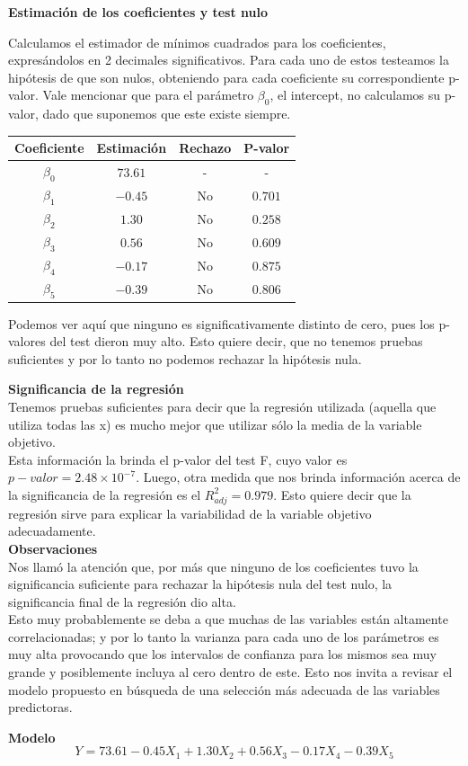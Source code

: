 \textbf{Estimación de los coeficientes y test nulo}

Calculamos el estimador de mínimos cuadrados para los coeficientes, expresándolos en 2 decimales significativos. Para cada uno de estos testeamos la hipótesis de que son nulos, obteniendo para cada coeficiente su correspondiente p-valor. Vale mencionar que para el parámetro $\beta_0$, el intercept, no calculamos su p-valor, dado que suponemos que este existe siempre.

\begin{center}
    \begin{tabular}{|c|c|c|c|}
        \hline
        Coeficiente & Estimación & Rechazo & P-valor \\ \hline
        $\beta_0$ & $73.61$ & - & - \\ \hline
        $\beta_1$ & $-0.45$ & No & $0.701$ \\ \hline
        $\beta_2$ & $1.30$ &  No & $ 0.258$ \\ \hline
        $\beta_3$ & $0.56$ & No & $0.609$ \\ \hline
        $\beta_4$ & $-0.17$ & No & $0.875$ \\ \hline
        $\beta_5$ & $-0.39$ & No & $0.806$ \\ \hline
    \end{tabular}
\end{center}

Podemos ver aquí que ninguno es significativamente distinto de cero, pues los p-valores del test dieron muy alto. Esto quiere decir, que no tenemos pruebas suficientes y por lo tanto no podemos rechazar la hipótesis nula.

\vskip0.2cm\textbf{Significancia de la regresión}\\
Tenemos pruebas suficientes para decir que la regresión utilizada (aquella que utiliza todas las x) es mucho mejor que utilizar sólo la media de la variable objetivo.\\
Esta información la brinda el p-valor del test F, cuyo valor es $p-valor = 2.48 \times 10^{-7}$.
Luego, otra medida que nos brinda información acerca de la significancia de la regresión es el $R^2_{adj} = 0.979$. Esto quiere decir que la regresión sirve para explicar la variabilidad de la variable objetivo adecuadamente.\\

\vskip0.2cm\textbf{Observaciones}\\
Nos llamó la atención que, por más que ninguno de los coeficientes tuvo la significancia suficiente para rechazar la hipótesis nula del test nulo, la significancia final de la regresión dio alta.\\
Esto muy probablemente se deba a que muchas de las variables están altamente correlacionadas; y por lo tanto la varianza para cada uno de los parámetros es muy alta provocando que los intervalos de confianza para los mismos sea muy grande y posiblemente incluya al cero dentro de este.
\vskip0.2cm
Esto nos invita a revisar el modelo propuesto en búsqueda de una selección más adecuada de las variables predictoras.

\vskip0.2cm\textbf{Modelo}\\
\begin{equation}\tag{M1}
    Y = 73.61 -0.45 X_{1} + 1.30 X_{2} + 0.56 X_{3} -0.17 X_{4} -0.39 X_{5}
\end{equation}